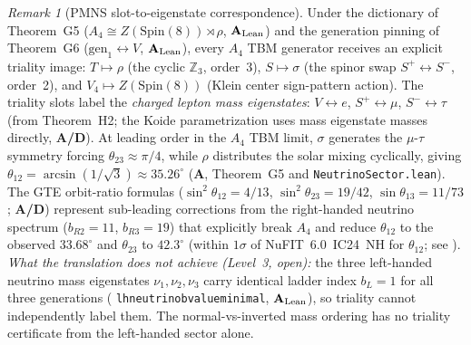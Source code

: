 \documentclass[11pt]{article}
\theoremstyle{remark}
\newtheorem{remark}[theorem]{Remark}
\newcommand{\lean}[1]{%
  \penalty-100
  \begingroup\def\_{\textunderscore\allowbreak}\texttt{#1}\endgroup}
\newcommand{\CatA}{\textbf{A}}
\newcommand{\CatAL}{\ensuremath{\textbf{A}_{\rm Lean}}}
\newcommand{\CatAD}{\textbf{A/D}}
\begin{document}
\begin{remark}[PMNS slot-to-eigenstate correspondence]
\label{rem:pmns}
Under the dictionary of Theorem~G5 ($A_4\cong Z(\mathrm{Spin}(8))\rtimes\rho$,
\CatAL) and the generation pinning of Theorem~G6 ($\mathrm{gen}_1\leftrightarrow V$,
\CatAL), every $A_4$ TBM generator receives an explicit triality image:
$T\mapsto\rho$ (the cyclic $\mathbb{Z}_3$, order~3), $S\mapsto\sigma$
(the spinor swap $S^+\leftrightarrow S^-$, order~2), and
$V_4\mapsto Z(\mathrm{Spin}(8))$ (Klein center sign-pattern action).
The triality slots label the \emph{charged lepton mass eigenstates}:
$V\leftrightarrow e$, $S^+\leftrightarrow\mu$, $S^-\leftrightarrow\tau$
(from Theorem~H2; the Koide parametrization uses mass eigenstate masses directly,
\CatAD).
At leading order in the $A_4$ TBM limit, $\sigma$ generates the $\mu$-$\tau$
symmetry forcing $\theta_{23}\approx\pi/4$, while $\rho$ distributes the solar
mixing cyclically, giving
$\theta_{12} = \arcsin(1/\sqrt{3})\approx 35.26^\circ$
(\CatA, Theorem~G5 and \lean{NeutrinoSector.lean}).
The GTE orbit-ratio formulas ($\sin^2\theta_{12} = 4/13$,
$\sin^2\theta_{23} = 19/42$, $\sin\theta_{13} = 11/73$; \CatAD) represent
sub-leading corrections from the right-handed neutrino spectrum
($b_{R2}=11$, $b_{R3}=19$) that explicitly break $A_4$ and reduce
$\theta_{12}$ to the observed $33.68^\circ$ and $\theta_{23}$ to $42.3^\circ$
(within $1\sigma$ of NuFIT~6.0~IC24~NH for $\theta_{12}$;
see \cite{SpivackGTECompleteFramework}).
\emph{What the translation does not achieve (Level~3, open):} the three
left-handed neutrino mass eigenstates $\nu_1, \nu_2, \nu_3$ carry identical
ladder index $b_L = 1$ for all three generations
(\lean{lh\_neutrino\_b\_value\_minimal}, \CatAL), so triality cannot
independently label them.
The normal-vs-inverted mass ordering has no triality certificate
from the left-handed sector alone.
\end{remark}
\end{document}

